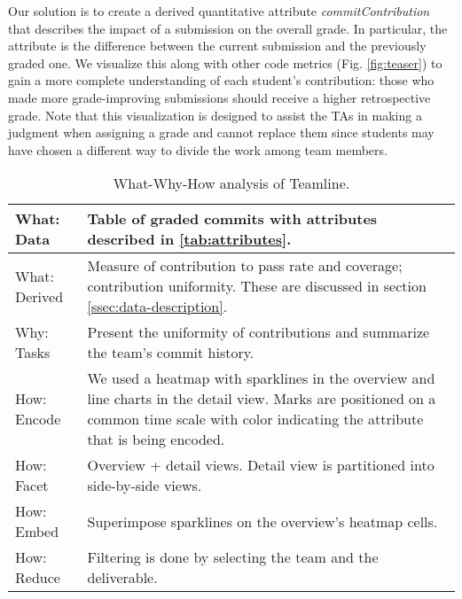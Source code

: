 \documentclass[../manifest.tex]{subfiles}
\begin{document}
Our solution is to create a derived quantitative attribute \textit{commitContribution} that describes
the impact of a submission on the overall grade. In particular, the attribute is
the difference between the current submission and the previously graded one. We
visualize this along with other code metrics (Fig. \ref{fig:teaser}) to gain a more
complete understanding of each student's contribution: those who made more grade-improving
submissions should receive a higher retrospective grade. Note that this visualization
is designed to assist the TAs in
making a judgment when assigning a grade and cannot replace them since students may
have chosen a different way to divide the work among team members.



\begin{table}
  \caption{What-Why-How analysis of Teamline.}
  \label{tab:analysis}
  \begin{tabularx}{\columnwidth}{ l | X }
    \hline
    What: Data & Table of graded commits with attributes described in \ref{tab:attributes}. \\
    \hline
    What: Derived & Measure of contribution to pass rate and coverage; contribution uniformity. These are discussed in section \ref{ssec:data-description}. \\
    \hline
    Why: Tasks & Present the uniformity of contributions and summarize the team's commit history. \\
    \hline
    How: Encode & We used a heatmap with sparklines in the overview  and line charts in the detail view. Marks are positioned on a common time scale with color indicating the attribute that is being encoded.\\
    \hline
    How: Facet & Overview + detail views. Detail view is partitioned into side-by-side views. \\
    \hline
    How: Embed & Superimpose sparklines on the overview's heatmap cells. \\
    \hline
    How: Reduce & Filtering is done by selecting the team and the deliverable. \\
    \hline
  \end{tabularx}
\end{table}
\end{document}
